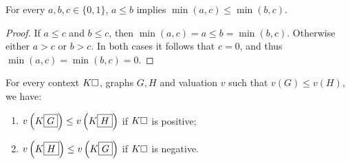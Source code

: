 \begin{lemma}
  For every $a, b, c \in \{0,1\}$, $a \leq b$ implies $\min(a, c) \leq \min(b,
  c)$.
\end{lemma}
\begin{proof}
  If $a \leq c$ and $b \leq c$, then $\min(a, c) = a \leq b = \min(b, c)$.
  Otherwise either $a > c$ or $b > c$. In both cases it follows that $c = 0$,
  and thus $\min(a, c) = \min(b, c) = 0$.
\end{proof}

\begin{lemma}[Variance]
  
  For every context $K\square$, graphs $G, H$ and valuation $v$ such that $v(G)
  \leq v(H)$, we have:
  \begin{enumerate}
    \item $v\left(K\fbox{$G$}\right) \leq v\left(K\fbox{$H$}\right)$ if $K\square$
    is positive;
    \item $v\left(K\fbox{$H$}\right) \leq v\left(K\fbox{$G$}\right)$ if $K\square$
    is negative.
  \end{enumerate}
\end{lemma}
